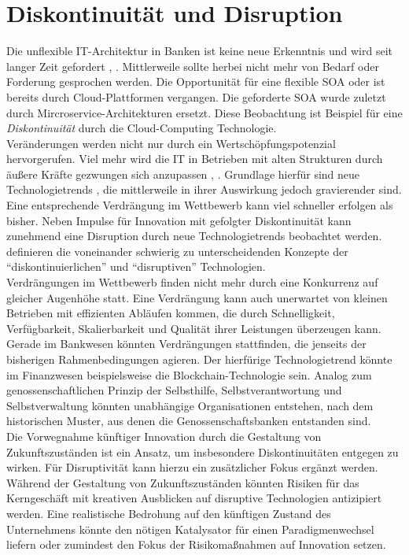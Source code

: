 \section{Diskontinuität und Disruption}
Die unflexible IT-Architektur in Banken ist keine neue Erkenntnis und wird seit langer Zeit gefordert \cite{Brockhoff2006}, \cite{Bussmann2006}. Mittlerweile sollte herbei nicht mehr von Bedarf oder Forderung gesprochen werden. Die Opportunität für eine flexible \ac{SOA} oder ist bereits durch Cloud-Plattformen vergangen. Die geforderte \ac{SOA} wurde zuletzt durch Mircroservice-Architekturen ersetzt. Diese Beobachtung ist Beispiel für eine \emph{Diskontinuität} durch die Cloud-Computing Technologie.
\medskip
\\
Veränderungen werden nicht nur durch ein Wertschöpfungspotenzial hervorgerufen. Viel mehr wird die IT in Betrieben mit alten Strukturen durch äußere Kräfte gezwungen sich anzupassen \cite{Alt2017}, \cite{Gupta:2017}. Grundlage hierfür sind neue Technologietrends \cite{Bussmann2006}, die mittlerweile in ihrer Auswirkung jedoch gravierender sind. Eine entsprechende Verdrängung im Wettbewerb kann viel schneller erfolgen als bisher. Neben Impulse für Innovation mit gefolgter Diskontinuität \cite{Alt2017} kann zunehmend eine Disruption durch neue Technologietrends beobachtet werden. \citet{Fernandez:2020} definieren die voneinander schwierig zu unterscheidenden Konzepte der \enquote{diskontinuierlichen} und \enquote{disruptiven} Technologien.
\medskip
\\
Verdrängungen im Wettbewerb finden nicht mehr durch eine Konkurrenz auf gleicher Augenhöhe statt. Eine Verdrängung kann auch unerwartet von kleinen Betrieben mit effizienten Abläufen kommen, die durch Schnelligkeit, Verfügbarkeit, Skalierbarkeit und Qualität ihrer Leistungen überzeugen kann.  Gerade im Bankwesen könnten Verdrängungen stattfinden, die jenseits der bisherigen Rahmenbedingungen agieren. Der hierfürige Technologietrend könnte im Finanzwesen beispielsweise die Blockchain-Technologie sein. Analog zum genossenschaftlichen Prinzip der Selbsthilfe, Selbstverantwortung und Selbstverwaltung könnten unabhängige Organisationen entstehen, nach dem historischen Muster, aus denen die Genossenschaftsbanken entstanden sind.
\medskip
\\
Die Vorwegnahme künftiger Innovation durch die Gestaltung von Zukunftszuständen \cite{Alt2017} ist ein Ansatz, um insbesondere Diskontinuitäten entgegen zu wirken. 
Für Disruptivität kann hierzu ein zusätzlicher Fokus ergänzt werden. Während der Gestaltung von Zukunftszuständen könnten Risiken für das Kerngeschäft mit kreativen Ausblicken auf disruptive Technologien antizipiert werden. Eine realistische Bedrohung auf den künftigen Zustand des Unternehmens könnte den nötigen Katalysator für einen Paradigmenwechsel liefern oder zumindest den Fokus der Risikomaßnahmen auf Innovation setzen.

